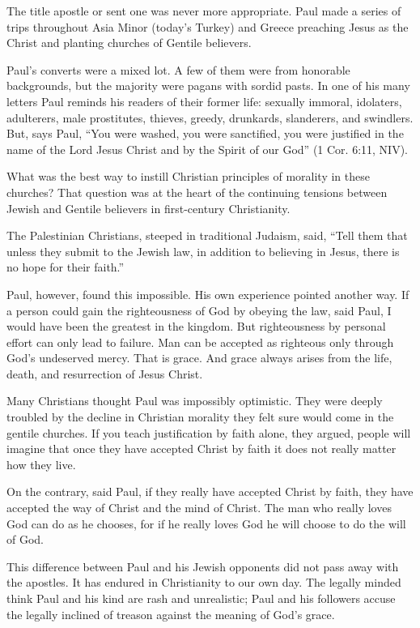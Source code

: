 The title apostle or sent one was never more appropriate. Paul made a series of trips throughout
Asia Minor (today’s Turkey) and Greece preaching Jesus as the Christ and planting churches of
Gentile believers.

Paul’s converts were a mixed lot. A few of them were from honorable backgrounds, but the majority
were pagans with sordid pasts. In one of his many letters Paul reminds his readers of their former
life: sexually immoral, idolaters, adulterers, male prostitutes, thieves, greedy, drunkards,
slanderers, and swindlers. But, says Paul, “You were washed, you were sanctified, you were justified
in the name of the Lord Jesus Christ and by the Spirit of our God” (1 Cor. 6:11, NIV).

What was the best way to instill Christian principles of morality in these churches? That question
was at the heart of the continuing tensions between Jewish and Gentile believers in first-century
Christianity.

The Palestinian Christians, steeped in traditional Judaism, said, “Tell them that unless they submit
to the Jewish law, in addition to believing in Jesus, there is no hope for their faith.”

Paul, however, found this impossible. His own experience pointed another way. If a person could gain
the righteousness of God by obeying the law, said Paul, I would have been the greatest in the
kingdom. But righteousness by personal effort can only lead to failure. Man can be accepted as
righteous only through God’s undeserved mercy. That is grace. And grace always arises from the life,
death, and resurrection of Jesus Christ.

Many Christians thought Paul was impossibly optimistic. They were deeply troubled by the decline in
Christian morality they felt sure would come in the gentile churches. If you teach justification by
faith alone, they argued, people will imagine that once they have accepted Christ by faith it does
not really matter how they live.

On the contrary, said Paul, if they really have accepted Christ by faith, they have accepted the way
of Christ and the mind of Christ. The man who really loves God can do as he chooses, for if he
really loves God he will choose to do the will of God.

This difference between Paul and his Jewish opponents did not pass away with the apostles. It has
endured in Christianity to our own day. The legally minded think Paul and his kind are rash and
unrealistic; Paul and his followers accuse the legally inclined of treason against the meaning of
God’s grace.

